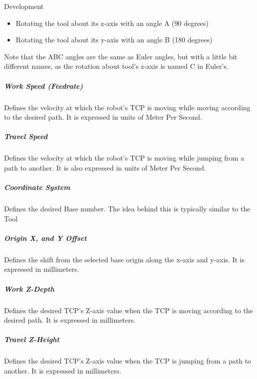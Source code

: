 \documentclass[a4paper]{book}
\begin{document}
\begin{chapter}{Development}
\begin{itemize}
	\item Rotating the tool about its z-axis with an angle A (90 degrees)
	\item Rotating the tool about its y-axis with an angle B (180 degrees)
\end{itemize}
Note that the ABC angles are the same as Euler angles, but with a little bit different names, as the rotation about tool’s z-axis is named C in Euler’s.
\subparagraph{Work Speed (Feedrate)}
Defines the velocity at which the robot's TCP is moving while moving according to the desired path. It is expressed in units of Meter Per Second.
\subparagraph{Travel Speed}
Defines the velocity at which the robot's TCP is moving while jumping from a path to another. It is also expressed in units of Meter Per Second.
\subparagraph{Coordinate System}
Defines the desired Base number. The idea behind this is typically similar to the Tool
\subparagraph{Origin X, and Y Offset}
Defines the shift from the selected base origin along the x-axis and y-axis. It is expressed in millimeters.
\subparagraph{Work Z-Depth}
Defines the desired TCP's Z-axis value when the TCP is moving according to the desired path. It is expressed in millimeters.

\subparagraph{Travel Z-Height}
Defines the desired TCP's Z-axis value when the TCP is jumping from a path to another. It is expressed in millimeters.


\end{chapter}
\end{document}
